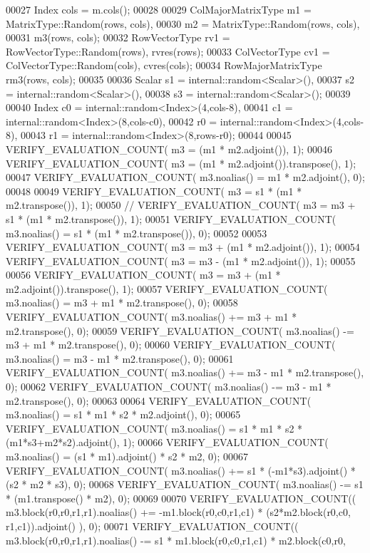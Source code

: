 \begin{DoxyCode}
00027   Index cols = m.cols();
00028 
00029   ColMajorMatrixType m1 = MatrixType::Random(rows, cols),
00030                      m2 = MatrixType::Random(rows, cols),
00031                      m3(rows, cols);
00032   RowVectorType rv1 = RowVectorType::Random(rows), rvres(rows);
00033   ColVectorType cv1 = ColVectorType::Random(cols), cvres(cols);
00034   RowMajorMatrixType rm3(rows, cols);
00035 
00036   Scalar s1 = internal::random<Scalar>(),
00037          s2 = internal::random<Scalar>(),
00038          s3 = internal::random<Scalar>();
00039 
00040   Index c0 = internal::random<Index>(4,cols-8),
00041         c1 = internal::random<Index>(8,cols-c0),
00042         r0 = internal::random<Index>(4,cols-8),
00043         r1 = internal::random<Index>(8,rows-r0);
00044 
00045   VERIFY\_EVALUATION\_COUNT( m3 = (m1 * m2.adjoint()), 1);
00046   VERIFY\_EVALUATION\_COUNT( m3 = (m1 * m2.adjoint()).transpose(), 1);
00047   VERIFY\_EVALUATION\_COUNT( m3.noalias() = m1 * m2.adjoint(), 0);
00048 
00049   VERIFY\_EVALUATION\_COUNT( m3 = s1 * (m1 * m2.transpose()), 1);
00050 \textcolor{comment}{//   VERIFY\_EVALUATION\_COUNT( m3 = m3 + s1 * (m1 * m2.transpose()), 1);}
00051   VERIFY\_EVALUATION\_COUNT( m3.noalias() = s1 * (m1 * m2.transpose()), 0);
00052 
00053   VERIFY\_EVALUATION\_COUNT( m3 = m3 + (m1 * m2.adjoint()), 1);
00054   VERIFY\_EVALUATION\_COUNT( m3 = m3 - (m1 * m2.adjoint()), 1);
00055 
00056   VERIFY\_EVALUATION\_COUNT( m3 = m3 + (m1 * m2.adjoint()).transpose(), 1);
00057   VERIFY\_EVALUATION\_COUNT( m3.noalias() = m3 + m1 * m2.transpose(), 0);
00058   VERIFY\_EVALUATION\_COUNT( m3.noalias() += m3 + m1 * m2.transpose(), 0);
00059   VERIFY\_EVALUATION\_COUNT( m3.noalias() -= m3 + m1 * m2.transpose(), 0);
00060   VERIFY\_EVALUATION\_COUNT( m3.noalias() =  m3 - m1 * m2.transpose(), 0);
00061   VERIFY\_EVALUATION\_COUNT( m3.noalias() += m3 - m1 * m2.transpose(), 0);
00062   VERIFY\_EVALUATION\_COUNT( m3.noalias() -= m3 - m1 * m2.transpose(), 0);
00063 
00064   VERIFY\_EVALUATION\_COUNT( m3.noalias() = s1 * m1 * s2 * m2.adjoint(), 0);
00065   VERIFY\_EVALUATION\_COUNT( m3.noalias() = s1 * m1 * s2 * (m1*s3+m2*s2).adjoint(), 1);
00066   VERIFY\_EVALUATION\_COUNT( m3.noalias() = (s1 * m1).adjoint() * s2 * m2, 0);
00067   VERIFY\_EVALUATION\_COUNT( m3.noalias() += s1 * (-m1*s3).adjoint() * (s2 * m2 * s3), 0);
00068   VERIFY\_EVALUATION\_COUNT( m3.noalias() -= s1 * (m1.transpose() * m2), 0);
00069 
00070   VERIFY\_EVALUATION\_COUNT(( m3.block(r0,r0,r1,r1).noalias() += -m1.block(r0,c0,r1,c1) * (s2*m2.block(r0,c0,
      r1,c1)).adjoint() ), 0);
00071   VERIFY\_EVALUATION\_COUNT(( m3.block(r0,r0,r1,r1).noalias() -= s1 * m1.block(r0,c0,r1,c1) * m2.block(c0,r0,

\end{DoxyCode}
